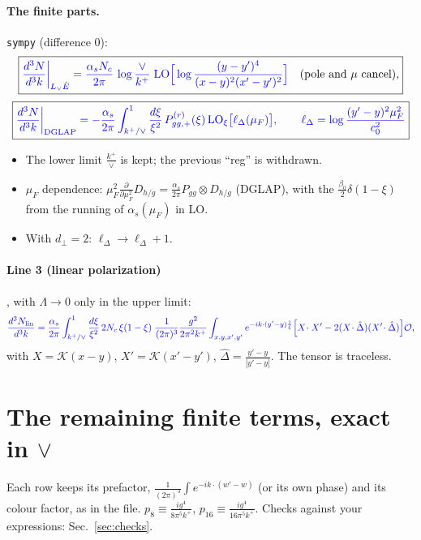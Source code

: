 \documentclass[10pt]{article}
\numberwithin{equation}{section}
\newcommand{\new}[1]{{\color{blue}#1}}
\newcommand{\Lv}{L_{\vee}}
\newcommand{\OO}{\mathcal O}
\newcommand{\KK}{\mathcal K}
\newcommand{\Dh}{\hat\Delta}
\newcommand{\Eh}{\hat E}
\newcommand{\LOx}[1]{{\rm LO}_\xi\big[#1\big]}
\newcommand{\pre}{\frac{1}{(2\pi)^3}}
\newcommand{\phw}{e^{-ik\cdot(w'-w)}}
\begin{document}
\paragraph{The finite parts.} \texttt{sympy} (difference $0$):
\begin{equation}
\boxed{\new{\frac{d^3N}{d^3k}\bigg|_{\Lv\Eh}=\frac{\alpha_sN_c}{2\pi}\,\log\frac{\vee}{k^+}\;{\rm LO}\Big[\log\frac{(y-y')^4}{(x-y)^2(x'-y')^2}\Big]}\quad(\text{pole and }\mu\text{ cancel}),}
\label{eq:LvE}
\end{equation}
\begin{equation}
\boxed{\new{\frac{d^3N}{d^3k}\bigg|_{\rm DGLAP}=-\frac{\alpha_s}{2\pi}\int_{k^+/\vee}^1\frac{d\xi}{\xi^2}\,P^{(r)}_{gg,+}(\xi)\,\LOx{\ell_\Delta(\mu_F)},\qquad\ell_\Delta=\log\frac{(y'-y)^2\mu_F^2}{c_0^2}}}
\label{eq:dglap}
\end{equation}
\begin{itemize}
\item The lower limit $\frac{k^+}{\vee}$ is kept; the previous ``reg'' is withdrawn.
\item $\mu_F$ dependence: $\mu_F^2\frac{\partial}{\partial\mu_F^2}D_{h/g}=\frac{\alpha_s}{2\pi}P_{gg}\otimes D_{h/g}$ (DGLAP), with the $\frac{\beta_0}{2}\delta(1-\xi)$ from the running of $\alpha_s(\mu_F)$ in LO.
\item With $d_\perp=2$: $\ell_\Delta\to\ell_\Delta+1$.
\end{itemize}

\paragraph{Line 3 (linear polarization)}, with $\Lambda\to0$ only in the upper limit:
\begin{equation}
\new{\frac{d^3N_{\rm lin}}{d^3k}=\frac{\alpha_s}{2\pi}\int_{k^+/\vee}^1\frac{d\xi}{\xi^2}\,2N_c\,\xi(1-\xi)\;\pre\frac{g^2}{2\pi^2k^+}\int_{x,y,x',y'}e^{-ik\cdot(y'-y)\frac1\xi}\Big[X\!\cdot X'-2(X\!\cdot\Dh)(X'\!\cdot\Dh)\Big]\OO},
\label{eq:lin}
\end{equation}
with $X=\KK(x-y)$, $X'=\KK(x'-y')$, $\Dh=\frac{y'-y}{|y'-y|}$. The tensor is traceless.

\section{The remaining finite terms, exact in \texorpdfstring{$\vee$}{vee}}\label{sec:simp}
Each row keeps its prefactor, $\pre\int\phw$ (or its own phase) and its colour factor, as in the file. $p_8\equiv\frac{ig^4}{8\pi^5k^+}$, $p_{16}\equiv\frac{ig^4}{16\pi^5k^+}$. Checks against your expressions: Sec.~\ref{sec:checks}.
\end{document}
